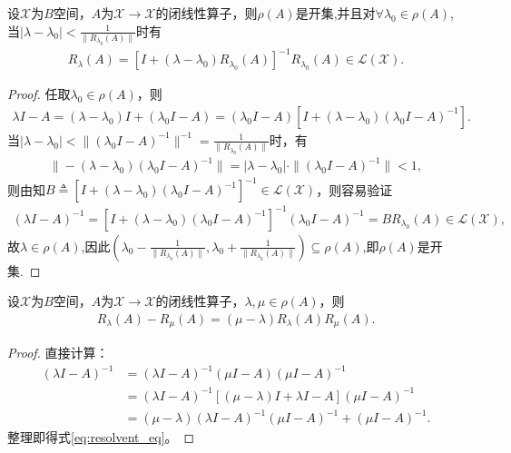 \documentclass[../../main.tex]{subfiles}%
\begin{document}
\begin{corollary}
设$\mathscr{X}$为$B$空间，$A$为$\mathscr{X}\to \mathscr{X}$的闭线性算子，则$\rho(A)$是开集,并且对$\forall \lambda_0\in \rho(A)$,当$|\lambda - \lambda_0|<\frac{1}{\|R_{\lambda_0}(A)\|}$时有
\begin{align}\label{eq:rho_open}
R_{\lambda}(A)=\left[ I+\left( \lambda -\lambda _0 \right) R_{\lambda _0}\left( A \right) \right] ^{-1}R_{\lambda _0}\left( A \right) \in \mathscr{L} \left( \mathscr{X} \right) .
\end{align}
\end{corollary}
\begin{proof}

任取$\lambda_0\in\rho(A)$，则
\begin{align*}
\lambda I-A=(\lambda-\lambda_0)I+(\lambda_0 I-A)
=(\lambda_0 I-A)\left[I+(\lambda-\lambda_0)(\lambda_0 I-A)^{-1}\right].
\end{align*}
当$|\lambda-\lambda_0|<\|(\lambda_0 I-A)^{-1}\|^{-1}=\frac{1}{\|R_{\lambda_0}(A)\|}$时，有
\begin{align*}
\|-(\lambda-\lambda_0)(\lambda_0 I-A)^{-1}\|=|\lambda-\lambda_0|\cdot \|(\lambda_0 I-A)^{-1}\|<1,
\end{align*}
则由知$B\triangleq\left[I+(\lambda-\lambda_0)(\lambda_0 I-A)^{-1}\right]^{-1}\in\mathscr{L}(\mathscr{X})$，则容易验证
\begin{align*}
(\lambda I-A)^{-1}=\left[I+(\lambda-\lambda_0)(\lambda_0 I-A)^{-1}\right]^{-1}(\lambda_0 I-A)^{-1}=BR_{\lambda_0}(A)\in\mathscr{L}(\mathscr{X}),
\end{align*}
故$\lambda\in\rho(A)$,因此$\left( \lambda _0-\frac{1}{\|R_{\lambda_0}(A)\|},\lambda _0+\frac{1}{\|R_{\lambda_0}(A)\|}\right) \subseteq \rho \left( A \right) $,即$\rho(A)$是开集.

\end{proof}

\begin{lemma}[第一预解公式]\label{lemma:第一预解公式}
设$\mathscr{X}$为$B$空间，$A$为$\mathscr{X}\to \mathscr{X}$的闭线性算子，$\lambda,\mu\in\rho(A)$，则
\begin{align}
R_{\lambda}(A)-R_{\mu}(A)=(\mu-\lambda)R_{\lambda}(A)R_{\mu}(A).\label{eq:resolvent_eq}
\end{align}
\end{lemma}
\begin{proof}

直接计算：
\begin{align*}
(\lambda I-A)^{-1}&=(\lambda I-A)^{-1}(\mu I-A)(\mu I-A)^{-1}\\
&=(\lambda I-A)^{-1}\left[(\mu-\lambda)I+\lambda I-A\right](\mu I-A)^{-1}\\
&=(\mu-\lambda)(\lambda I-A)^{-1}(\mu I-A)^{-1}+(\mu I-A)^{-1}.
\end{align*}
整理即得式\eqref{eq:resolvent_eq}。

\end{proof}
\end{document}
